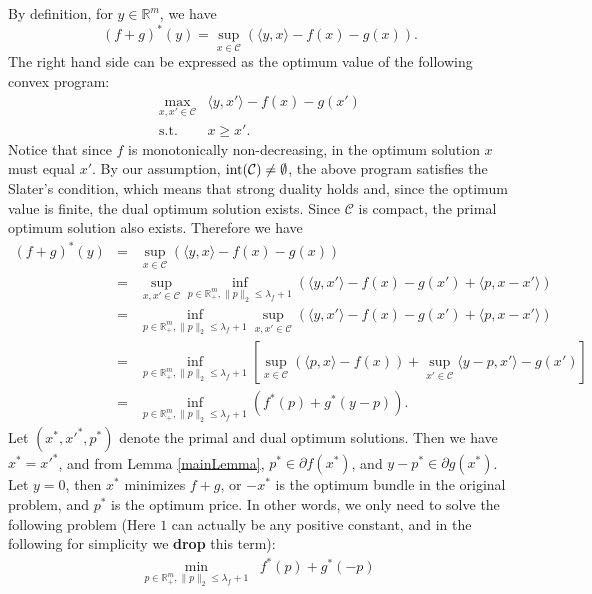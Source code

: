 \documentclass{article}
\def\int{\textup{int}}
\begin{document}
By definition, for $y\in \mathbb{R}^m$, we have
\begin{equation}
    (f+g)^*(y)=\sup_{x\in \mathcal{C}}(\langle y,x\rangle-f(x)-g(x)).
\end{equation}
The right hand side can be expressed as the optimum value of the following convex program:
\begin{equation}
    \begin{array}{rl}
        \displaystyle\max_{x,x'\in \mathcal{C}} & \langle y,x'\rangle-f(x)-g(x') \\
        \mathrm{s.t.} & x\ge x'.
    \end{array}
\end{equation}
Notice that since $f$ is monotonically non-decreasing, in the optimum solution $x$ must equal $x'$. By our assumption, $\int(\mathcal{C})\ne\emptyset$, the above program satisfies the Slater's condition, which means that strong duality holds and, since the optimum value is finite, the dual optimum solution exists. Since $\mathcal{C}$ is compact, the primal optimum solution also exists. Therefore we have
\begin{equation}
    \begin{array}{rcl}
        (f+g)^*(y) & = & \sup_{x\in \mathcal{C}}(\langle y,x\rangle-f(x)-g(x)) \\
         & = & \sup_{x,x'\in \mathcal{C}}\inf_{p\in \mathbb{R}_+^m,\|p\|_2\le\lambda_f+1}(\langle y,x'\rangle-f(x)-g(x')+\langle p,x-x'\rangle) \\
         & = & \inf_{p\in \mathbb{R}_+^m,\|p\|_2\le\lambda_f+1}\sup_{x,x'\in \mathcal{C}}(\langle y,x'\rangle-f(x)-g(x')+\langle p,x-x'\rangle) \\
         & = & \inf_{p\in \mathbb{R}_+^m,\|p\|_2\le\lambda_f+1}[\sup_{x\in \mathcal{C}}(\langle p,x\rangle-f(x))+\sup_{x'\in \mathcal{C}}\langle y-p,x'\rangle-g(x')] \\
         & = & \inf_{p\in \mathbb{R}_+^m,\|p\|_2\le\lambda_f+1}(f^*(p)+g^*(y-p)).
    \end{array}
\end{equation}
Let $(x^*,x'^*,p^*)$ denote the primal and dual optimum solutions. Then we have $x^*=x'^*$, and from Lemma \ref{mainLemma}, $p^*\in\partial f(x^*)$, and $y-p^*\in\partial g(x^*)$. Let $y=0$, then $x^*$ minimizes $f+g$, or $-x^*$ is the optimum bundle in the original problem, and $p^*$ is the optimum price. In other words, we only need to solve the following problem (Here $1$ can actually be any positive constant, and in the following for simplicity we \textbf{drop} this term):
\begin{equation}\label{dualProb}
    \begin{array}{rl}
        \displaystyle\min_{p\in \mathbb{R}_+^m,\|p\|_2\le\lambda_f+1} & f^*(p)+g^*(-p)
    \end{array}
\end{equation}
\end{document}

